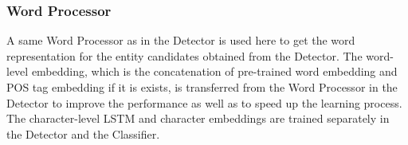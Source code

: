 \documentclass[11pt,a4paper]{article}
\begin{document}
\begin{table*}[!ht]
\centering
{}
\caption{Corpora Statistics for the ACE-2004, ACE-2005 and CoNLL-2003 datasets.}
\label{data_statistics}
\end{table*}

\subsubsection{Word Processor}
A same Word Processor as in the Detector is used here to get the word representation for the entity candidates obtained from the Detector.
The word-level embedding, which is the concatenation of pre-trained word embedding and POS tag embedding if it is exists, is transferred from the Word Processor in the Detector to improve the performance as
well as to speed up the learning process. The character-level LSTM and character embeddings are trained separately in the Detector and the Classifier.
\end{document}
